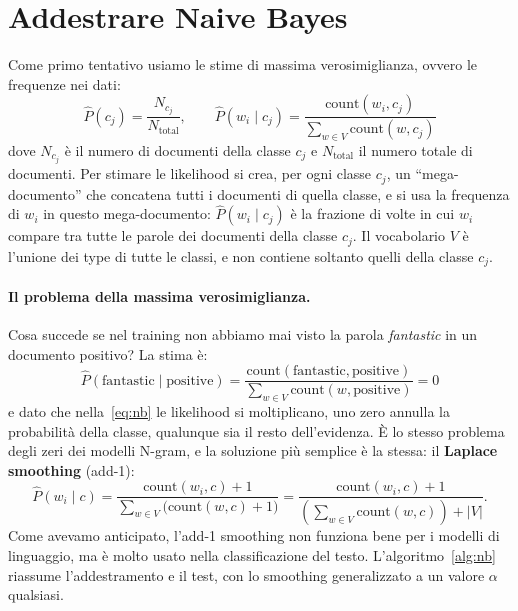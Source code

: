 \section{Addestrare Naive Bayes}
Come primo tentativo usiamo le stime di massima verosimiglianza, ovvero le frequenze nei dati:
\begin{equation}\label{eq:nb-mle}
\hat{P}(c_j) = \frac{N_{c_j}}{N_{\text{total}}}, \qquad \hat{P}(w_i \mid c_j) = \frac{\text{count}(w_i, c_j)}{\sum_{w \in V} \text{count}(w, c_j)}
\end{equation}
dove $N_{c_j}$ è il numero di documenti della classe $c_j$ e $N_{\text{total}}$ il numero totale di documenti. Per stimare le likelihood si crea, per ogni classe $c_j$, un \enquote{mega-documento} che concatena tutti i documenti di quella classe, e si usa la frequenza di $w_i$ in questo mega-documento: $\hat{P}(w_i \mid c_j)$ è la frazione di volte in cui $w_i$ compare tra tutte le parole dei documenti della classe $c_j$. Il vocabolario $V$ è l'unione dei type di tutte le classi, e non contiene soltanto quelli della classe $c_j$.

\paragraph{Il problema della massima verosimiglianza.} Cosa succede se nel training non abbiamo mai visto la parola \textit{fantastic} in un documento positivo? La stima è:
\[
\hat{P}(\text{fantastic} \mid \text{positive}) = \frac{\text{count}(\text{fantastic}, \text{positive})}{\sum_{w \in V} \text{count}(w, \text{positive})} = 0
\]
e dato che nella~\eqref{eq:nb} le likelihood si moltiplicano, uno zero annulla la probabilità della classe, qualunque sia il resto dell'evidenza. È lo stesso problema degli zeri dei modelli N-gram, e la soluzione più semplice è la stessa: il \textbf{Laplace smoothing} (add-1):
\begin{equation}\label{eq:nb-laplace}
\hat{P}(w_i \mid c) = \frac{\text{count}(w_i, c) + 1}{\sum_{w \in V} \big(\text{count}(w, c) + 1\big)} = \frac{\text{count}(w_i, c) + 1}{\left(\sum_{w \in V} \text{count}(w, c)\right) + |V|}.
\end{equation}
Come avevamo anticipato, l'add-1 smoothing non funziona bene per i modelli di linguaggio, ma è molto usato nella classificazione del testo. L'algoritmo~\ref{alg:nb} riassume l'addestramento e il test, con lo smoothing generalizzato a un valore $\alpha$ qualsiasi.

